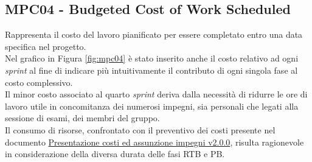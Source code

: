 \subsection{MPC04 - Budgeted Cost of Work Scheduled}
\label{s:mpc04}
Rappresenta il costo del lavoro pianificato per essere completato entro una data specifica nel progetto.\\
Nel grafico in Figura \ref{fig:mpc04} è stato inserito anche il costo relativo ad ogni \textit{sprint} al fine di indicare più intuitivamente il contributo di ogni singola fase al costo complessivo.\\
Il minor costo associato al quarto \textit{sprint} deriva dalla necessità di ridurre le ore di lavoro utile in concomitanza dei numerosi impegni, sia personali che legati alla sessione di esami, dei membri del gruppo.\\
Il consumo di risorse, confrontato con il preventivo dei costi presente nel documento \href{https://project-swenergy.github.io/Candidatura/Presentazione%20costi%20e%20assunzione%20impegni.pdf}{Presentazione costi ed assunzione impegni v2.0.0}, risulta ragionevole in considerazione della diversa durata delle fasi RTB e PB.\\

